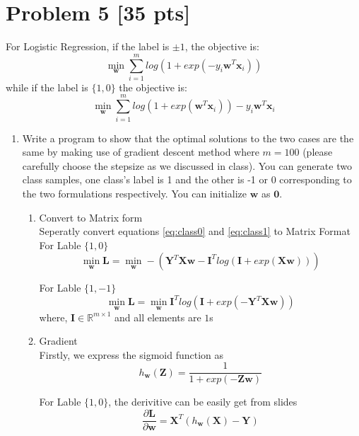 \documentclass[11pt]{article}
\newcommand{\mtx}[1]{\mathbf{#1}}
\newcommand{\vct}[1]{\mathbf{#1}}
\def \mI {\mtx{I}}
\def \mL {\mtx{L}}
\def \mX {\mtx{X}}
\def \mY {\mtx{Y}}
\def \mZ {\mtx{Z}}
\def \vzero    {\vct{0}}
\def \vw {\vct{w}}
\def \vx {\vct{x}}
\begin{document}
\section*{Problem 5 [35 pts]}
For Logistic Regression, if the label is $\pm1$, the objective is:
\begin{equation}\label{eq:class1}
\min_\vw	\sum_{i=1}^{m}log(1+exp(-y_i\vw^T\vx_i))
\end{equation}
while if the label is $\{1,0\}$ the objective is:
\begin{equation}\label{eq:class0}
	\min_\vw	\sum_{i=1}^{m}log(1+exp(\vw^T\vx_i))-y_i\vw^T\vx_i
\end{equation}
\begin{enumerate}
	\item Write a program to show that the optimal solutions to the two cases  are the same by making use of gradient descent method where $m=100$ (please carefully choose the stepsize as we discussed in class). You can generate two class samples, one class's label is 1 and the other is -1 or 0 corresponding to the two formulations respectively. You can initialize $\vw$ as $\vzero$.
	\begin{enumerate}
		
		\item Convert to Matrix form \\
		Seperatly convert equations \ref{eq:class0} and  \ref{eq:class1} to Matrix Format
		\\
		For Lable $\{1,0\}$
		\begin{equation}
			\min_\vw \mL = \min_\vw -(\mY^T\mX\vw - \mI^Tlog(\mI+exp(\mX\vw)))
		\end{equation}

		For Lable $\{1,-1\}$
		\begin{equation}
			\min_\vw \mL = \min_\vw \mI^Tlog(\mI+exp(-\mY^T\mX\vw ))
		\end{equation}
		where, 
		$\mI \in \mathbb{R}^{m\times 1}$ and all elements are $1$s
		\item Gradient\\
		Firstly, we express the sigmoid function as 
		\begin{equation}
			h_{\vw}(\mZ) = \frac{1}{1+exp(-\mZ\vw)}
		\end{equation}

		For Lable $\{1,0\}$, the derivitive can be easily get from slides
		\begin{equation}
			\frac{\partial \mL}{\partial \vw} = \mX^T(h_{\vw}(\mX)-\mY)
		\end{equation}


\end{enumerate}
\end{enumerate}
\end{document}
